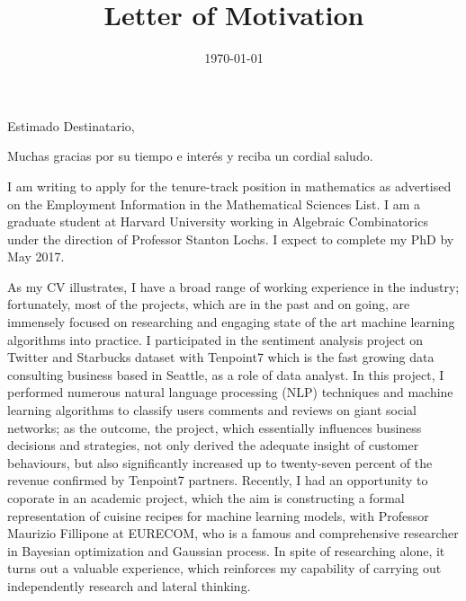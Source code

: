 \documentclass[11pt,a4paper,roman]{moderncv}        %
\title{Letter of Motivation}                               %
\begin{document}
\date{\today}
\opening{Estimado Destinatario,}
\closing{Muchas gracias por su tiempo e interés y reciba un cordial saludo.}
\makelettertitle

I am writing to apply for the tenure-track position in mathematics as advertised on the Employment Information in the Mathematical Sciences List. I am a graduate student at Harvard University working in Algebraic Combinatorics under the direction of Professor Stanton Lochs. I expect to complete my PhD by May 2017.

As my CV illustrates, I have a broad range of working experience in the industry; fortunately, most of the projects, which are in the past and on going, are immensely focused on researching and engaging state of the art machine learning algorithms into practice. I participated in the sentiment analysis project on Twitter and Starbucks dataset with Tenpoint7 which is the fast growing data consulting business based in Seattle, as a role of data analyst. In this project, I performed numerous natural language processing (NLP) techniques and machine learning algorithms to classify  users comments and reviews on giant social networks; as the outcome, the project, which essentially influences business decisions and strategies, not only derived the adequate insight of customer behaviours, but also significantly increased up to twenty-seven percent of the revenue confirmed by Tenpoint7 partners. Recently, I had an opportunity to coporate in an academic project, which the aim is constructing a formal representation of cuisine recipes for machine learning models, with Professor Maurizio Fillipone at EURECOM, who is a famous and comprehensive researcher in Bayesian optimization and Gaussian process. In spite of researching alone, it turns out a valuable experience, which reinforces my capability of carrying out independently research and lateral thinking.


\vspace{0.5cm}


\makeletterclosing
\end{document}
